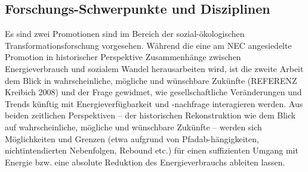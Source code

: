 \documentclass[a4paper,11pt,twoside]{scrartcl}
\begin{document}
\subsection{Forschungs-Schwerpunkte und Disziplinen}
Es sind zwei Promotionen sind im Bereich der sozial-ökologischen Transformationsforschung vorgesehen. Während die eine am NEC angesiedelte Promotion in historischer Perspektive Zusammenhänge zwischen Energieverbrauch und sozialem Wandel herausarbeiten wird, ist die zweite Arbeit dem Blick in wahrscheinliche, mögliche und wünschbare Zukünfte (REFERENZ Kreibich 2008) und der Frage gewidmet, wie gesellschaftliche Veränderungen und Trends künftig mit Energieverfügbarkeit und -nachfrage interagieren werden. Aus beiden zeitlichen Perspektiven – der historischen Rekonstruktion wie dem Blick auf wahrscheinliche, mögliche und wünschbare Zukünfte – werden sich Möglichkeiten und Grenzen (etwa aufgrund von Pfadab-hängigkeiten, nichtintendierten Nebenfolgen, Rebound etc.) für einen suffizienten Umgang mit Energie bzw. eine absolute Reduktion des Energieverbrauchs ableiten lassen.

\end{document}
